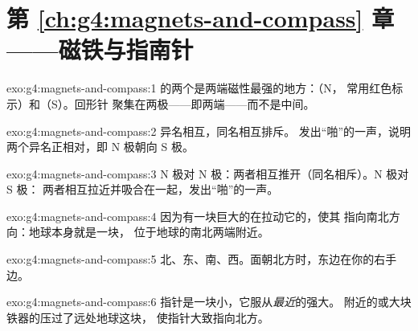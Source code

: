 \section*{第 \ref{ch:g4:magnets-and-compass} 章——磁铁与指南针}

\begin{solution}{exo:g4:magnets-and-compass:1}
的两个是两端磁性最强的地方：（N，
常用红色标示）和（S）。回形针
聚集在两极——即两端——而不是中间。
\end{solution}

\begin{solution}{exo:g4:magnets-and-compass:2}
异名相互，同名相互排斥。
发出“啪”的一声，说明两个异名正相对，即 N 极朝向 S 极。
\end{solution}

\begin{solution}{exo:g4:magnets-and-compass:3}
N 极对 N 极：两者相互推开（同名相斥）。N 极对 S 极：
两者相互拉近并吸合在一起，发出“啪”的一声。
\end{solution}

\begin{solution}{exo:g4:magnets-and-compass:4}
因为有一块巨大的在拉动它的，使其
指向南北方向：地球本身就是一块，
位于地球的南北两端附近。
\end{solution}

\begin{solution}{exo:g4:magnets-and-compass:5}
北、东、南、西。面朝北方时，东边在你的右手边。
\end{solution}

\begin{solution}{exo:g4:magnets-and-compass:6}
指针是一块小，它服从\emph{最近}的强大。
附近的或大块铁器的压过了远处地球这块，
使指针大致指向北方。
\end{solution}

